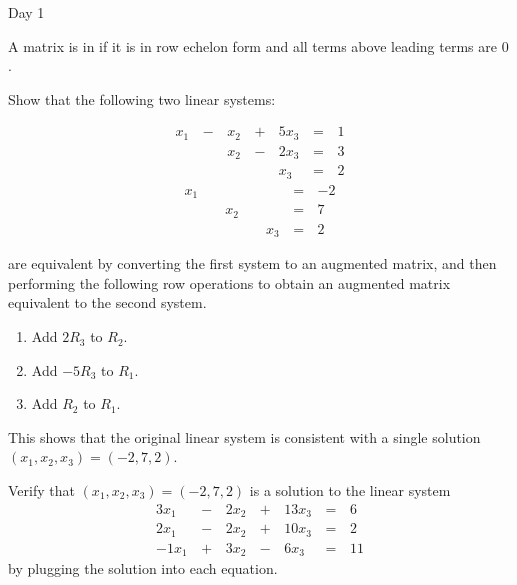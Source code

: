 \begin{applicationActivities}{Day 1}
\begin{definition}
  A matrix is in  if it is in row echelon form
  and all terms above leading terms are \(0\).
\end{definition}

\begin{activity}
  Show that the following two linear systems:
  \begin{multicols}{2}\noindent
    \begin{alignat*}{4}
       x_1 &\,-\,&  x_2  &\,+\,&  5x_3 &\,=\,& 1 \\
           &\, \,&  x_2 &\,-\,&  2x_3 &\,=\,& 3 \\
           &\, \,&      &\, \,&   x_3 &\,=\,& 2
    \end{alignat*}
      \begin{alignat*}{4}
         x_1 &\, \,&      &\, \,&       &\,=\,& -2 \\
             &\, \,&  x_2 &\, \,&       &\,=\,& 7 \\
             &\, \,&      &\, \,&   x_3 &\,=\,& 2
      \end{alignat*}
  \end{multicols}
  are equivalent by converting the first system to an augmented matrix,
  and then performing the following row operations to obtain
  an augmented matrix equivalent to the second system.
  \begin{enumerate}
    \item Add \(2R_3\) to \(R_2\).
    \item Add \(-5R_3\) to \(R_1\).
    \item Add \(R_2\) to \(R_1\).
  \end{enumerate}
  This shows that the original linear system is consistent with a single
  solution \((x_1,x_2,x_3)=(-2,7,2)\).
\end{activity}

\begin{activity}
  Verify that \((x_1,x_2,x_3)=(-2,7,2)\) is a solution to the linear system
    \begin{alignat*}{4}
      3x_1 &\,-\,& 2x_2 &\,+\,& 13x_3 &\,=\,& 6 \\
      2x_1 &\,-\,& 2x_2 &\,+\,& 10x_3 &\,=\,& 2 \\
     -1x_1 &\,+\,& 3x_2 &\,-\,&  6x_3 &\,=\,& 11
    \end{alignat*}
  by plugging the solution into each equation.
\end{activity}


\end{applicationActivities}
